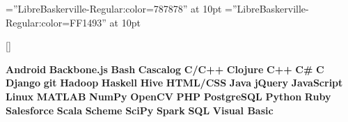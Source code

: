 \newcommand{\oneskill}{%
  \textcolor{white}{\symbol{"2022}}
  \textcolor{white}{\symbol{"2022}}
  \textcolor{notefive}{\symbol{"2022}}
}

\newcommand{\twoskill}{%
  \textcolor{white}{\symbol{"2022}}
  \textcolor{notethree}{\symbol{"2022}}
  \textcolor{notefive}{\symbol{"2022}}
}

\newcommand{\threeskill}{%
  \textcolor{noteone}{\symbol{"2022}}
  \textcolor{notethree}{\symbol{"2022}}
  \textcolor{notefive}{\symbol{"2022}}
}


\setsansfont [Ligatures={Common}, BoldFont={GeosansLight}, ItalicFont={GeosansLight}]{GeosansLight}
\setmonofont{GeosansLight}

\font\lighttext=''LibreBaskerville-Regular:color=787878'' at 10pt
\font\lighttextweb=''LibreBaskerville-Regular:color=FF1493'' at 10pt

\titleformat{\section}{\Large\scshape\raggedright\sffamily}{}{0em}{}[\titlerule]

\setlength{\parindent}{0pt}

\newcommand{\skill}{\textbf}
\newcommand{\skills}[2]{
  \item #2 #1
}

\newcommand{\institution}{\textsc}

\def\div{\,\textbar{}\,}

\usepackage{xspace}


\newcommand{\lang}[2]{\expandafter\def\csname #1\endcsname{\skill{#2}\xspace}}

\lang{android}{Android}
\lang{backbone}{Backbone.js}
\lang{bash}{Bash}
\lang{cascalog}{Cascalog}
\lang{ccpp}{C/C++}
\lang{clojure}{Clojure}
\lang{cpp}{C++}
\lang{csh}{C\#}
\lang{c}{C}
\lang{django}{Django}
\lang{git}{git}
\lang{hadoop}{Hadoop}
\lang{haskell}{Haskell}
\lang{hive}{Hive}
\lang{html}{HTML/CSS}
\lang{java}{Java}
\lang{jquery}{jQuery}
\lang{js}{JavaScript}
\lang{linux}{Linux}
\lang{matlab}{MATLAB}
\lang{numpy}{NumPy}
\lang{opencv}{OpenCV}
\lang{php}{PHP}
\lang{postgres}{PostgreSQL}
\lang{python}{Python}
\lang{ruby}{Ruby}
\lang{salesforce}{Salesforce}
\lang{scala}{Scala}
\lang{scheme}{Scheme}
\lang{scipy}{SciPy}
\lang{spark}{Spark}
\lang{sql}{SQL}
\lang{visb}{Visual Basic}
